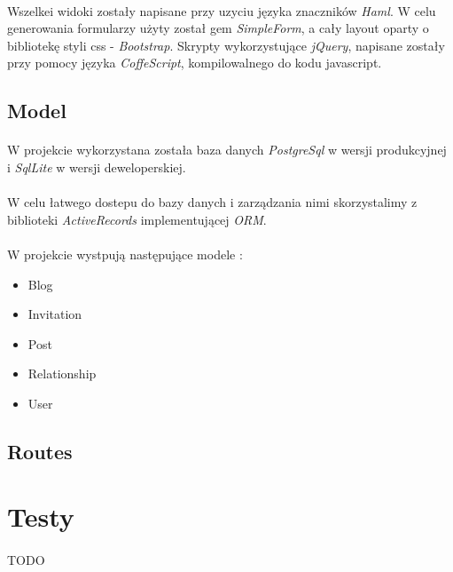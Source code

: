 \documentclass[wide,a4paper,titlepage,12pt] {article}
\begin{document}
    \paragraph{}
    Wszelkei widoki zostały napisane przy uzyciu języka znaczników \textit{Haml}. W celu generowania formularzy użyty został gem \textit{SimpleForm}, a cały layout oparty o bibliotekę styli css - \textit{Bootstrap}. Skrypty wykorzystujące \textit{jQuery}, napisane zostały przy pomocy języka \textit{CoffeScript}, kompilowalnego do kodu javascript.
    
    \subsection{Model}
    \paragraph{}
    W projekcie wykorzystana została baza danych \textit{PostgreSql} w wersji produkcyjnej i \textit{SqlLite} w wersji deweloperskiej.

    \paragraph{}
    W celu łatwego dostepu do bazy danych i zarządzania nimi skorzystalimy z biblioteki \textit{ActiveRecords} implementującej \textit{ORM}.

    \paragraph{}
    W projekcie wystpują następujące modele :
    \begin{itemize}
      \item Blog
      \item Invitation
      \item Post
      \item Relationship
      \item User
    \end{itemize}

    \subsection{Routes}
    \paragraph{}
      \small{
        
      }

      \section{Testy}
      \paragraph{}
      TODO




  
\end{document}
